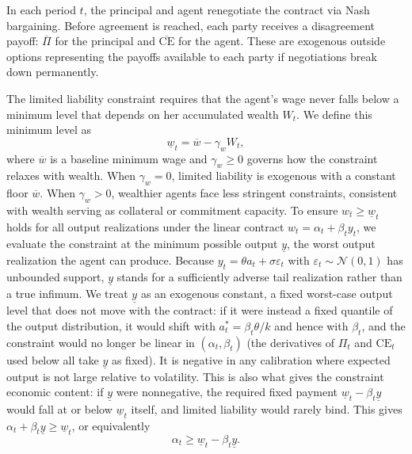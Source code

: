 \documentclass{article}
\theoremstyle{definition}
\theoremstyle{plain}
\begin{document}
In each period $t$, the principal and agent renegotiate the contract via Nash bargaining. Before agreement is reached, each party receives a disagreement payoff: $\overline{\Pi}$ for the principal and $\overline{\text{CE}}$ for the agent. These are exogenous outside options representing the payoffs available to each party if negotiations break down permanently. 

The limited liability constraint requires that the agent's wage never falls below a minimum level that depends on her accumulated wealth $W_t$. We define this minimum level as
\[
\underline{w}_t = \overline{w} - \gamma_w W_t,
\]
where $\overline{w}$ is a baseline minimum wage and $\gamma_w \geq 0$ governs how the constraint relaxes with wealth. When $\gamma_w = 0$, limited liability is exogenous with a constant floor $\overline{w}$. When $\gamma_w > 0$, wealthier agents face less stringent constraints, consistent with wealth serving as collateral or commitment capacity. To ensure $w_t \geq \underline{w}_t$ holds for all output realizations under the linear contract $w_t = \alpha_t + \beta_t y_t$, we evaluate the constraint at the minimum possible output $\underline{y}$, the worst output realization the agent can produce. Because $y_t = \theta a_t + \sigma \varepsilon_t$ with $\varepsilon_t \sim \mathcal{N}(0,1)$ has unbounded support, $\underline{y}$ stands for a sufficiently adverse tail realization rather than a true infimum. We treat $\underline{y}$ as an exogenous constant, a fixed worst-case output level that does not move with the contract: if it were instead a fixed quantile of the output distribution, it would shift with $a_t^*=\beta_t\theta/k$ and hence with $\beta_t$, and the constraint would no longer be linear in $(\alpha_t,\beta_t)$ (the derivatives of $\Pi_t$ and $\text{CE}_t$ used below all take $\underline{y}$ as fixed). It is negative in any calibration where expected output is not large relative to volatility. This is also what gives the constraint economic content: if $\underline{y}$ were nonnegative, the required fixed payment $\underline{w}_t - \beta_t \underline{y}$ would fall at or below $\underline{w}_t$ itself, and limited liability would rarely bind. This gives $\alpha_t + \beta_t \underline{y} \geq \underline{w}_t$, or equivalently
\[
\alpha_t \geq \underline{w}_t - \beta_t \underline{y}.
\]
\end{document}
